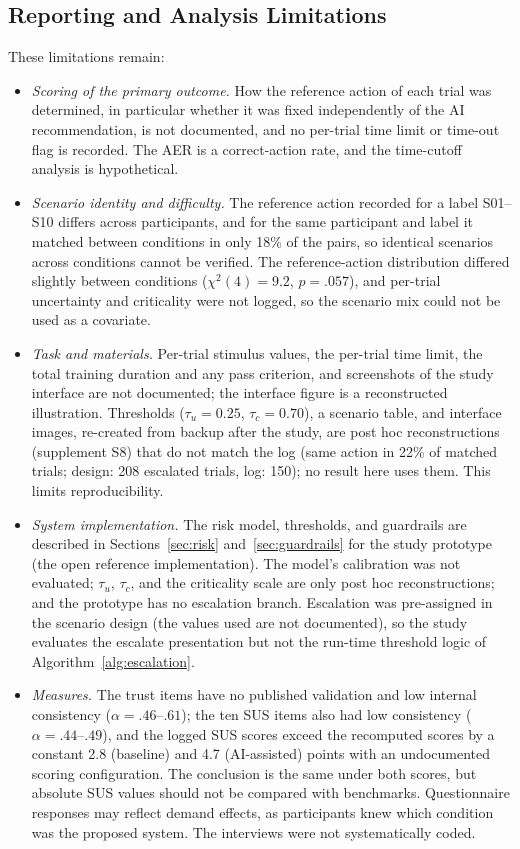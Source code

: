 \documentclass[journal]{IEEEtran}
\theoremstyle{plain}
\theoremstyle{definition}
\providecommand{\DIFaddtex}[1]{{\protect\color{blue} \sf #1}} %
\providecommand{\DIFadd}[1]{\texorpdfstring{\DIFaddtex{#1}}{#1}} %
\begin{document}
    \subsection{\DIFadd{Reporting and Analysis Limitations}}
    \label{sec:lim_reporting}
    \DIFadd{These limitations remain:
    }\begin{itemize}
        \item \DIFadd{\emph{Scoring of the primary outcome.} How the reference action of each trial was determined, in particular whether it was fixed independently of the AI recommendation, is not documented, and no per-trial time limit or time-out flag is recorded. The AER is a correct-action rate, and the time-cutoff analysis is hypothetical.
        }\item \DIFadd{\emph{Scenario identity and difficulty.} The reference action recorded for a label S01--S10 differs across participants, and for the same participant and label it matched between conditions in only 18\% of the pairs, so identical scenarios across conditions cannot be verified. The reference-action distribution differed slightly between conditions ($\chi^2(4)=9.2$, $p=.057$), and per-trial uncertainty and criticality were not logged, so the scenario mix could not be used as a covariate.
        }\item \DIFadd{\emph{Task and materials.} Per-trial stimulus values, the per-trial time limit, the total training duration and any pass criterion, and screenshots of the study interface are not documented; the interface figure is a reconstructed illustration. Thresholds ($\tau_u = 0.25$, $\tau_c = 0.70$), a scenario table, and interface images, re-created from backup after the study, are post hoc reconstructions (supplement S8) that do not match the log (same action in 22\% of matched trials; design: 208 escalated trials, log: 150); no result here uses them. This limits reproducibility.
        }\item \DIFadd{\emph{System implementation.} The risk model, thresholds, and guardrails are described in Sections~\ref{sec:risk} and~\ref{sec:guardrails} for the study prototype (the open reference implementation). The model's calibration was not evaluated; $\tau_u$, $\tau_c$, and the criticality scale are only post hoc reconstructions; and the prototype has no escalation branch. Escalation was pre-assigned in the scenario design (the values used are not documented), so the study evaluates the escalate presentation but not the run-time threshold logic of Algorithm~\ref{alg:escalation}.
        }\item \DIFadd{\emph{Measures.} The trust items have no published validation and low internal consistency ($\alpha = .46$--$.61$); the ten SUS items also had low consistency ($\alpha = .44$--$.49$), and the logged SUS scores exceed the recomputed scores by a constant 2.8 (baseline) and 4.7 (AI-assisted) points with an undocumented scoring configuration. The conclusion is the same under both scores, but absolute SUS values should not be compared with benchmarks. Questionnaire responses may reflect demand effects, as participants knew which condition was the proposed system. The interviews were not systematically coded.
}
\end{itemize}
\end{document}
